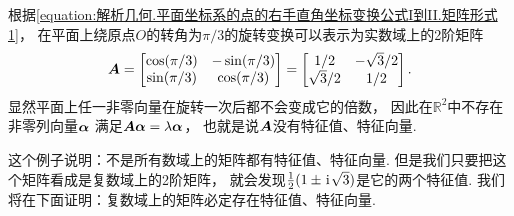 \begin{example}
根据\cref{equation:解析几何.平面坐标系的点的右手直角坐标变换公式I到II.矩阵形式1}，
在平面上绕原点\(O\)的转角为\(\pi/3\)的旋转变换可以表示为实数域上的2阶矩阵\begin{equation*}
	\boldsymbol{A}
	= \begin{bmatrix}
		\cos(\pi/3) & -\sin(\pi/3) \\
		\sin(\pi/3) & \cos(\pi/3)
	\end{bmatrix}
	= \begin{bmatrix}
		1/2 & -\sqrt3/2 \\
		\sqrt3/2 & 1/2
	\end{bmatrix}.
\end{equation*}
显然平面上任一非零向量在旋转一次后都不会变成它的倍数，
因此在\(\mathbb{R}^2\)中不存在非零列向量\(\boldsymbol\alpha\)
满足\(\boldsymbol{A}\boldsymbol\alpha=\lambda\boldsymbol\alpha\)，
也就是说\(\boldsymbol{A}\)没有特征值、特征向量.

这个例子说明：不是所有数域上的矩阵都有特征值、特征向量.
但是我们只要把这个矩阵看成是复数域上的2阶矩阵，
就会发现\(\frac12(1\pm\kern1pt\mathrm{i}\kern1pt\sqrt3)\)是它的两个特征值.
我们将在下面证明：复数域上的矩阵必定存在特征值、特征向量.
\end{example}

